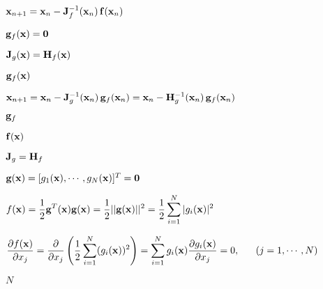 \documentclass{article}
\def\lthtmlcheckvsize{\ifdim\ht\sizebox<\vsize 
  \ifdim\wd\sizebox<\hsize\expandafter\hfill\fi \expandafter\vfill
  \else\expandafter\vss\fi}%
\begin{document}
{\newpage\clearpage
{}%
$ {\bf x}_{n+1}={\bf x}_n-{\bf J}_f^{-1}({\bf x}_n)\,{\bf f}({\bf x}_n)$%
\lthtmlindisplaymathZ
\lthtmlcheckvsize\clearpage}

{\newpage\clearpage
{}%
$ {\bf g}_f({\bf x})={\bf0}$%
\lthtmlindisplaymathZ
\lthtmlcheckvsize\clearpage}

{\newpage\clearpage
{}%
$ {\bf J}_g({\bf x})={\bf H}_f({\bf x})$%
\lthtmlindisplaymathZ
\lthtmlcheckvsize\clearpage}

{\newpage\clearpage
{}%
$ {\bf g}_f({\bf x})$%
\lthtmlindisplaymathZ
\lthtmlcheckvsize\clearpage}

{\newpage\clearpage
{}%
$\displaystyle {\bf x}_{n+1}={\bf x}_n-{\bf J}_g^{-1}({\bf x}_n)\,{\bf g}_f({\bf x}_n)
={\bf x}_n-{\bf H}_g^{-1}({\bf x}_n)\,{\bf g}_f({\bf x}_n)$%
\lthtmlindisplaymathZ
\lthtmlcheckvsize\clearpage}

{\newpage\clearpage
{}%
$ {\bf g}_f$%
\lthtmlindisplaymathZ
\lthtmlcheckvsize\clearpage}

{\newpage\clearpage
{}%
$ {\bf f}({\bf x})$%
\lthtmlindisplaymathZ
\lthtmlcheckvsize\clearpage}

{\newpage\clearpage
{}%
$ {\bf J}_g={\bf H}_f$%
\lthtmlindisplaymathZ
\lthtmlcheckvsize\clearpage}

{\newpage\clearpage
{}%
$ {\bf g}({\bf x})=[g_1({\bf x}),\cdots,g_N({\bf x})]^T={\bf0}$%
\lthtmlindisplaymathZ
\lthtmlcheckvsize\clearpage}

{\newpage\clearpage
{}%
$\displaystyle f({\bf x})=\frac{1}{2}{\bf g}^T({\bf x}){\bf g}({\bf x})
=\frac{1}{2}||{\bf g}({\bf x})||^2
=\frac{1}{2}\sum_{i=1}^N |g_i({\bf x})|^2$%
\lthtmlindisplaymathZ
\lthtmlcheckvsize\clearpage}

{\newpage\clearpage
{}%
$\displaystyle \frac{\partial{f({\bf x})}}{\partial x_j}
=\frac{\partial}{\partial x_j}\left(\frac{1}{2}\sum_{i=1}^N (g_i({\bf x}))^2\right)
=\sum_{i=1}^N g_i({\bf x})\frac{\partial g_i({\bf x})}{\partial x_j}=0,\;\;\;\;\;\;
(j=1,\cdots,N)$%
\lthtmlindisplaymathZ
\lthtmlcheckvsize\clearpage}

{\newpage\clearpage
{}%
$ N$%
\lthtmlindisplaymathZ
\lthtmlcheckvsize\clearpage}
\end{document}

